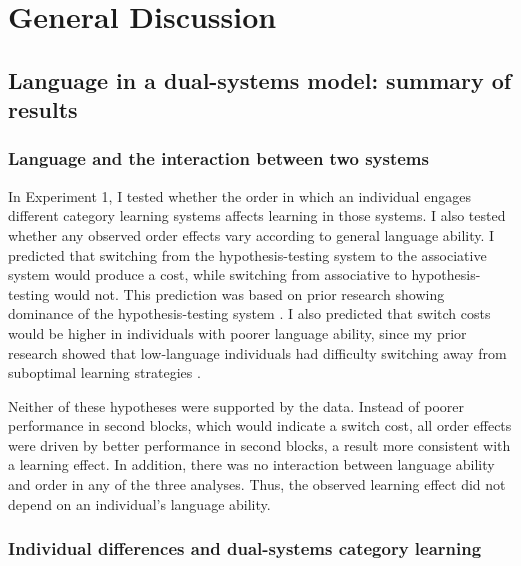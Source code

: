 \documentclass[../dissertation.tex]{subfiles}
\begin{document}
\section{General Discussion}

\subsection{Language in a dual-systems model: summary of results}
\subsubsection{Language and the interaction between two systems}
In Experiment 1, I tested whether the order in which an individual engages different category learning systems affects learning in those systems. I also tested whether any observed order effects vary according to general language ability. I predicted that switching from the hypothesis-testing system to the associative system would produce a cost, while switching from associative to hypothesis-testing would not. This prediction was based on prior research showing dominance of the hypothesis-testing system \citep{Erickson2008, Ashby2010}. I also predicted that switch costs would be higher in individuals with poorer language ability, since my prior research showed that low-language individuals had difficulty switching away from suboptimal learning strategies \citep{Ryherd2019}. \par 
Neither of these hypotheses were supported by the data. Instead of poorer performance in second blocks, which would indicate a switch cost, all order effects were driven by better performance in second blocks, a result more consistent with a learning effect. In addition, there was no interaction between language ability and order in any of the three analyses. Thus, the observed learning effect did not depend on an individual's language ability.

\subsubsection{Individual differences and dual-systems category learning}
\end{document}
